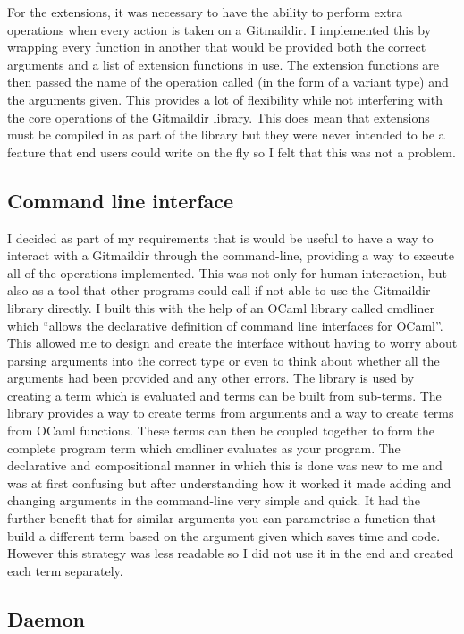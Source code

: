 For the extensions, it was necessary to have the ability to perform extra operations when every action is taken on a Gitmaildir. I implemented this by wrapping every function in another that would be provided both the correct arguments and a list of extension functions in use. The extension functions are then passed the name of the operation called (in the form of a variant type) and the arguments given. This provides a lot of flexibility while not interfering with the core operations of the Gitmaildir library. This does mean that extensions must be compiled in as part of the library but they were never intended to be a feature that end users could write on the fly so I felt that this was not a problem.

\subsection{Command line interface}

I decided as part of my requirements that is would be useful to have a way to interact with a Gitmaildir through the command-line, providing a way to execute all of the operations implemented. This was not only for human interaction, but also as a tool that other programs could call if not able to use the Gitmaildir library directly. I built this with the help of an OCaml library called cmdliner which ``allows the declarative definition of command line interfaces for OCaml''\cite{code_cmdliner}. This allowed me to design and create the interface without having to worry about parsing arguments into the correct type or even to think about whether all the arguments had been provided and any other errors. The library is used by creating a term which is evaluated and terms can be built from sub-terms. The library provides a way to create terms from arguments and a way to create terms from OCaml functions. These terms can then be coupled together to form the complete program term which cmdliner evaluates as your program. The declarative and compositional manner in which this is done was new to me and was at first confusing but after understanding how it worked it made adding and changing arguments in the command-line very simple and quick. It had the further benefit that for similar arguments you can parametrise a function that build a different term based on the argument given which saves time and code. However this strategy was less readable so I did not use it in the end and created each term separately.

\subsection{Daemon}

